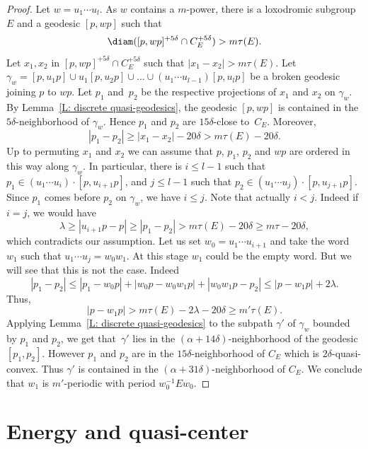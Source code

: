 \begin{proof}
Let $w=u_1\cdots u_l$.
As $w$ contains a $m$-power, there is a loxodromic subgroup~$E$ and a geodesic $[p,wp]$ such that
\[
\diam([p,wp]^{+5\delta} \cap C_E^{+5\delta}) > m \tau(E).
\]
\Changel
Let $x_1, x_2$ in $[p,wp]^{+5\delta} \cap C_E^{+5\delta}$ such that $|x_1 - x_2| > m \tau(E)$.
Let $\gamma_w= [p,u_1p] \cup u_1[p,u_2p] \cup \ldots \cup (u_1\cdots u_{l-1})[p,u_lp]$ be a broken geodesic joining $p$ to $wp$.
Let $p_1$ and~$p_2$ be the respective projections of $x_1$ and $x_2$ on $\gamma_w$.
By Lemma~\ref{L: discrete quasi-geodesics}, the geodesic $[p,wp]$ is contained in the $5\delta$-neighborhood of $\gamma_w$.
Hence $p_1$ and $p_2$ are $15\delta$-close to~$C_E$.
Moreover,
\[
|p_1 -p_2| \geqslant |x_1-x_2| - 20\delta > m \tau(E) - 20\delta.
\]
Up to permuting $x_1$ and $x_2$ we can assume that $p$, $p_1$, $p_2$ and $wp$ are ordered in this way along $\gamma_w$.
In particular, there is $i \leqslant l-1$ such that $p_1 \in (u_1\cdots u_i) \cdot [ p, u_{i+1} p]$, and $j\leqslant l-1$ such that $p_2 \in (u_1\cdots u_j) \cdot [ p, u_{j+1} p]$.
Since $p_1$ comes before $p_2$ on $\gamma_w$, we have $i \leq j$.
Note that actually $i < j$.
Indeed if $i=j$, we would have
\begin{equation*}
\lambda \geq |u_{i+1}p -p| \geq |p_1-p_2| > m \tau(E) - 20\delta \geq m\tau - 20\delta,
\end{equation*}
which contradicts our assumption.
Let us set $w_0=u_1\cdots u_{i+1}$ and take the word $w_1$ such that $u_1\cdots u_j = w_0w_1 $.
At this stage $w_1$ could be the empty word.
But we will see that this is not the case.
Indeed
\[
|p_1 -p_2| \leqslant |p_1 - w_0p| + |w_0p-w_0w_1p| + |w_0w_1p-p_2| \leqslant |p-w_1p|+2\lambda.
\]
Thus,
\[
|p-w_1p|>
m \tau(E) -2 \lambda - 20\delta
\geq m' \tau(E).
\]
Applying Lemma~\ref{L: discrete quasi-geodesics} to the subpath $\gamma'$ of $\gamma_w$ bounded by $p_1$ and $p_2$, we get that~$\gamma'$ lies in the $(\alpha + 14\delta)$-neighborhood of the geodesic $[p_1, p_2]$.
However $p_1$ and $p_2$ are in the $15\delta$-neighborhood of $C_E$ which is $2\delta$-quasi-convex.
Thus $\gamma'$ is contained in the $(\alpha +31\delta)$-neighborhood of $C_E$.
We conclude that $w_1$ is $m'$-periodic with period $w_0^{-1}Ew_0$.
\Changelback
\end{proof}

\section{Energy and quasi-center}

